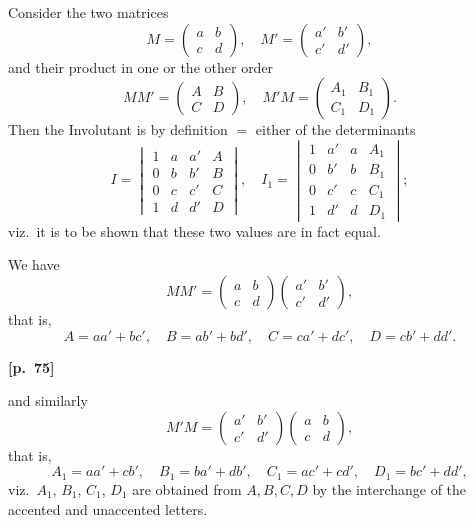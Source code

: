 \documentclass[11pt,a4paper]{book}
\begin{document}
Consider the two matrices
$$
M = \begin{pmatrix} a & b \\ c & d \end{pmatrix}, \quad M' = \begin{pmatrix} a' & b' \\ c' & d' \end{pmatrix},
$$
and their product in one or the other order
$$
MM' = \begin{pmatrix} A & B \\ C & D \end{pmatrix}, \quad M'M = \begin{pmatrix} A_1 & B_1 \\ C_1 & D_1 \end{pmatrix}.
$$
Then the Involutant is by definition $=$ either of the determinants
$$
I = \begin{vmatrix} 1 & a & a' & A \\ 0 & b & b' & B \\ 0 & c & c' & C \\ 1 & d & d' & D \end{vmatrix}, \quad
I_1 = \begin{vmatrix} 1 & a' & a & A_1 \\ 0 & b' & b & B_1 \\ 0 & c' & c & C_1 \\ 1 & d' & d & D_1 \end{vmatrix};
$$
viz.\ it is to be shown that these two values are in fact equal.

We have
$$
MM' = \begin{pmatrix} a & b \\ c & d \end{pmatrix} \begin{pmatrix} a' & b' \\ c' & d' \end{pmatrix},
$$
that is,
$$
A = aa' + bc', \quad B = ab' + bd', \quad C = ca' + dc', \quad D = cb' + dd'.
$$

\vspace{0.5em}
\noindent\textbf{[p.\ 75]}

and similarly
$$
M'M = \begin{pmatrix} a' & b' \\ c' & d' \end{pmatrix} \begin{pmatrix} a & b \\ c & d \end{pmatrix},
$$
that is,
$$
A_1 = aa' + cb', \quad B_1 = ba' + db', \quad C_1 = ac' + cd', \quad D_1 = bc' + dd',
$$
viz.\ $A_1$, $B_1$, $C_1$, $D_1$ are obtained from $A, B, C, D$ by the interchange of the accented and unaccented letters.
\end{document}
